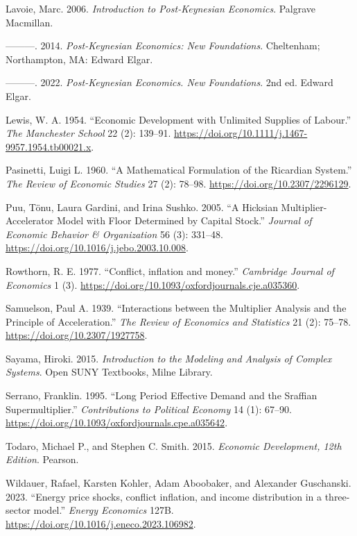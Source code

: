 \documentclass[
  letterpaper,
  DIV=11,
  numbers=noendperiod]{scrreprt}
\newlength{\cslhangindent}
\newenvironment{CSLReferences}[2] %
 {\begin{list}{}{%
  \setlength{\itemindent}{0pt}
  \setlength{\leftmargin}{0pt}
  \setlength{\parsep}{0pt}
  \ifodd #1
   \setlength{\leftmargin}{\cslhangindent}
   \setlength{\itemindent}{-1\cslhangindent}
  \fi
  \setlength{\itemsep}{#2\baselineskip}}}
 {\end{list}}
\begin{document}
\begin{CSLReferences}{1}{0}
Lavoie, Marc. 2006. \emph{Introduction to Post-Keynesian Economics}.
Palgrave Macmillan.

---------. 2014. \emph{Post-{Keynesian Economics}: {New Foundations}}.
Cheltenham; Northampton, MA: {Edward Elgar}.

---------. 2022. \emph{Post-Keynesian Economics. New Foundations}. 2nd
ed. Edward Elgar.

Lewis, W. A. 1954. {``{Economic Development with Unlimited Supplies of
Labour}.''} \emph{The Manchester School} 22 (2): 139--91.
\url{https://doi.org/10.1111/j.1467-9957.1954.tb00021.x}.

Pasinetti, Luigi L. 1960. {``{A Mathematical Formulation of the
Ricardian System}.''} \emph{The Review of Economic Studies} 27 (2):
78--98. \url{https://doi.org/10.2307/2296129}.

Puu, Tönu, Laura Gardini, and Irina Sushko. 2005. {``A Hicksian
Multiplier-Accelerator Model with Floor Determined by Capital Stock.''}
\emph{Journal of Economic Behavior \& Organization} 56 (3): 331--48.
\url{https://doi.org/10.1016/j.jebo.2003.10.008}.

Rowthorn, R. E. 1977. {``{Conflict, inflation and money}.''}
\emph{Cambridge Journal of Economics} 1 (3).
\url{https://doi.org/10.1093/oxfordjournals.cje.a035360}.

Samuelson, Paul A. 1939. {``{Interactions between the Multiplier
Analysis and the Principle of Acceleration}.''} \emph{The Review of
Economics and Statistics} 21 (2): 75--78.
\url{https://doi.org/10.2307/1927758}.

Sayama, Hiroki. 2015. \emph{Introduction to the Modeling and Analysis of
Complex Systems}. Open SUNY Textbooks, Milne Library.

Serrano, Franklin. 1995. {``{Long Period Effective Demand and the
Sraffian Supermultiplier}.''} \emph{Contributions to Political Economy}
14 (1): 67--90.
\url{https://doi.org/10.1093/oxfordjournals.cpe.a035642}.

Todaro, Michael P., and Stephen C. Smith. 2015. \emph{Economic
Development, 12th Edition}. Pearson.

Wildauer, Rafael, Karsten Kohler, Adam Aboobaker, and Alexander
Guschanski. 2023. {``{Energy price shocks, conflict inflation, and
income distribution in a three-sector model}.''} \emph{Energy Economics}
127B. \url{https://doi.org/10.1016/j.eneco.2023.106982}.

\end{CSLReferences}
\end{document}
